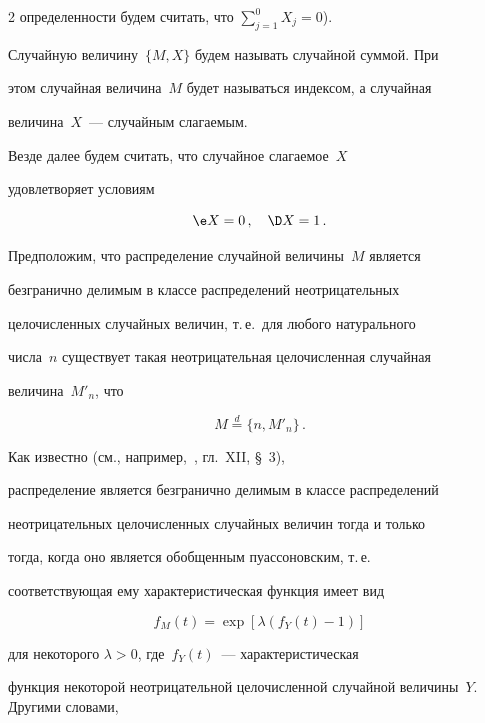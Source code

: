 \begin{multicols}{2}
определенности будем считать, что $\sum\limits_{j=1}^0 X_j = 0$).


Случайную величину~$\{M,X\}$ будем называть случайной суммой. При


этом случайная величина~$M$ будет называться индексом, а случайная


величина~$X$~--- случайным слагаемым.





Везде далее будем считать, что случайное слагаемое~$X$


удовлетворяет условиям


\begin{equation}


 \e X =0\,, \quad \D X =1\,.


 \label{Tu02}


\end{equation}





Предположим, что распределение случайной величины~$M$ является


безгранично делимым в классе распределений неотрицательных


целочисленных случайных величин, т.\,е.\ для любого натурального


числа~$n$ существует такая неотрицательная целочисленная случайная


величина~$M'_n$, что


$$


M \stackrel{d}{=} \{n,M'_n\}\,.


$$


Как известно (см., например,~\cite{3g}, гл.~XII, \S~3),


распределение является безгранично делимым в классе распределений


неотрицательных целочисленных случайных величин тогда и только


тогда, когда оно является обобщенным пуассоновским, т.\,е.\


соответствующая ему характеристическая функция имеет вид


$$


f_M(t) = \exp[\lambda(f_Y(t)-1)]


$$


для некоторого $\lambda>0$, где~$f_Y(t)$~--- характеристическая


функция некоторой неотрицательной це\-ло\-чис\-ленной случайной величины~$Y$. Другими сло\-вами,



\end{multicols}
